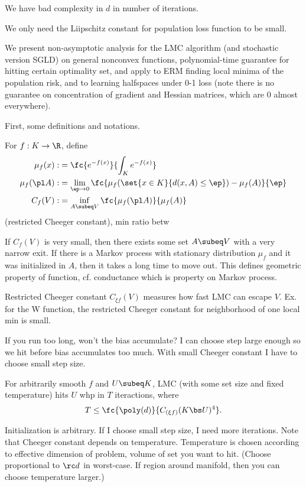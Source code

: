 
We have bad complexity in $d$ in number of iterations.

We only need the Liipschitz constant for population loss function to be small. 

We present non-asymptotic analysis for the LMC algorithm (and stochastic version SGLD) on general nonconvex functions, polynomial-time guarantee for hitting certain optimality set, and apply to ERM finding local minima of the population risk, and to learning halfspaces under 0-1 loss (note there is no guarantee on concentration of gradient and Hessian matrices, which are 0 almost everywhere). 

First, some definitions and notations.

For $f:K\to \R$, define
\begin{align}
\mu_f(x):&= \fc{e^{-f(x)}}{\int_K e^{-f(x)}}\\
\mu_f(\pl A) :&= \lim_{\ep\to 0} \fc{\mu_f(\set{x\in K}{d(x,A)\le \ep})-\mu_f(A)}{\ep}\\
C_f(V) :&= \inf_{A\subeq V} \fc{\mu_f(\pl A)}{\mu_f(A)}
\end{align}
(restricted Cheeger constant), min ratio betw%

If $C_f(V)$ is very small, then there exists some set $A\subeq V$ with a very narrow exit. If there is a Markov process with stationary distribution $\mu_f$ and it was initialized in $A$, then it takes a long time to move out.
This defines geometric property of function, cf. conductance which is property on Markov process.

Restricted Cheeger constant $C_{\xi f}(V)$ measures how fast LMC can escape $V$.
Ex. for the W function, the restricted Cheeger constant for neighborhood of one local min is small.

If you run too long, won't the bias accumulate? I can choose step large enough so we hit before bias accumulates too much. With small Cheeger constant I have to choose small step size.



\begin{thm}
For arbitrarily smooth $f$ and $U\subeq K$, LMC (with some set size and fixed temperature) hits $U$ whp in $T$ iteractions, where
$$
T\le \fc{\poly(d)}{C_{(\xi f)} (K\bs U)^4}.
$$
\end{thm}
Initialization is arbitrary.
If I choose small step size, I need more iterations.
Note that Cheeger constant depends on temperature. Temperature is chosen according to effective dimension of problem, volume of set you want to hit. (Choose proportional to $\rc d$ in worst-case. If region around manifold, then you can choose temperature larger.)

